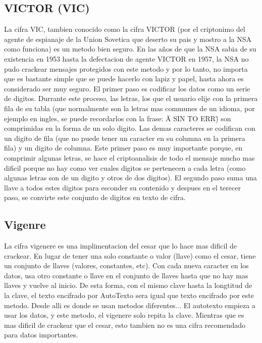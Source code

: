 \documentclass{article}
\begin{document}
		\subsection{VICTOR (VIC)}
			La cifra VIC, tambien conocido como la cifra VICTOR (por el criptonimo del agente de espianaje de la Union Sovetica que deserto su pais y mostro a la NSA como funciona) es un metodo bien seguro. En las años de que la NSA sabia de su existencia en 1953 hasta la defectacion de agente VICTOR en 1957, la NSA no pudo crackear mensajes protegidos con este metodo y por lo tanto, no importa que es bastante simple que se puede hacerlo con lapiz y papel, hasta ahora es considerado ser muy seguro. El primer paso es codificar los datos como un serie de digitos. Durrante este proceso, las letras, los que el usuario elije con la primera fila de su tabla (que normalmente son la letras mas communes de un idioma, por ejemplo en ingles, se puede recordarlos con la frase: \"A SIN TO ERR\") son comprimidas en la forma de un solo digito. Las demas caracteres se codifican con un digito de fila (que no puede tener un caracter en su columna en la primera fila) y un digito de columna. Este primer paso es muy importante porque, en comprimir algunas letras, se hace el criptoanalisis de todo el mensaje mucho mas dificil porque no hay como ver cuales digitos se pertenecen a cada letra (como algunas letras son de un digito y otros de dos digitos). El segundo paso suma una llave a todos estes digitos para esconder su contenido y despues en el terecer paso, se convirte este conjunto de digitos en texto de cifra.
		\subsection{Vigenre}
			La cifra vigenere es una implimentacion del cesar que lo hace mas dificil de crackear. En lugar de tener una solo constante o valor (llave) como el cesar, tiene un conjunto de llaves (valores, constantes, etc). Con cada nueva caracter en los datos, usa otro constante o llave en el conjunto de llaves hasta que no hay mas llaves y vuelve al inicio. De esta forma, con el mismo clave hasta la longtitud de la clave, el texto encifrado por AutoTexto sera igual que texto encifrado por este metodo. Desde alli es donde se usan metodos diferentes... El autotexto empieza a usar los datos, y este metodo, el vigenere solo repita la clave. Mientras que es mas dificil de crackear que el cesar, esto tambien no es una cifra recomendado para datos importantes.
\end{document}
